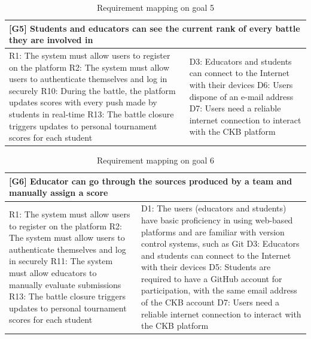 \begin{table}[H]
    \centering
    \begin{tabular}{|p{8cm}|p{8cm}|}
    \hline
        \multicolumn{2}{|p{16cm}|}{\textbf{[G5] Students and educators can see the current rank of every battle they are involved in}} \\
    \hline
        R1: The system must allow users to register on the platform \newline
        R2: The system must allow users to authenticate themselves and log in securely \newline
        R10: During the battle, the platform updates scores with every push made by students in real-time \newline
        R13: The battle closure triggers updates to personal tournament scores for each student 
        &
        D3: Educators and students can connect to the Internet with their devices \newline
        D6: Users dispone of an e-mail address \newline
        D7: Users need a reliable internet connection to interact with the CKB platform\\
    \hline
    \end{tabular}
    \caption{Requirement mapping on goal 5}
    \label{tab:g5}
\end{table}
\begin{table}[H]
    \centering
    \begin{tabular}{|p{8cm}|p{8cm}|}
    \hline
        \multicolumn{2}{|p{16cm}|}{\textbf{[G6] Educator can go through the sources produced by a team and manually assign a score}} \\
    \hline
        R1: The system must allow users to register on the platform  \newline
        R2: The system must allow users to authenticate themselves and log in securely \newline
        R11: The system must allow educators to manually evaluate submissions \newline
        R13: The battle closure triggers updates to personal tournament scores for each student \newline
        &
        D1: The users (educators and students) have basic proficiency in using web-based platforms and are familiar with version control systems, such as Git \newline
        D3: Educators and students can connect to the Internet with their devices \newline
        D5: Students are required to have a GitHub account for participation, with the same email address of the CKB account \newline
        D7: Users need a reliable internet connection to interact with the CKB platform\\
    \hline
    \end{tabular}
    \caption{Requirement mapping on goal 6}
    \label{tab:g6}
\end{table}
